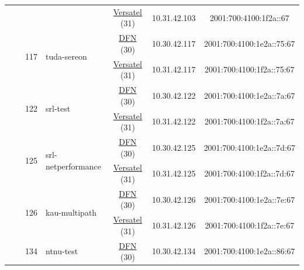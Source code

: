 \begin{small}
\begin{center}
\begin{longtable}{|c|c|c|c|c|c|c|c|}
  &  & \multicolumn{2}{|c|}{} & \multicolumn{2}{|c|}{\tiny{\href{http://www.versatel.de}{Versatel} (31)}} & \tiny{10.31.42.103} & \tiny{2001:700:4100:1f2a::67} \\* \cline{3-3}\cline{4-4}\cline{5-5}\cline{6-6}\cline{7-7}\cline{8-8}
  &  & \multirow{2}{*}{\tiny{117}} & \multicolumn{1}{|l|}{\multirow{2}{*}{\tiny{tuda-sereon}}} & \multicolumn{2}{|c|}{\tiny{\href{https://www.dfn.de}{DFN} (30)}} & \tiny{10.30.42.117} & \tiny{2001:700:4100:1e2a::75:67} \\* \cline{5-5}\cline{6-6}\cline{7-7}\cline{8-8}
  &  &  &  & \multicolumn{2}{|c|}{\tiny{\href{http://www.versatel.de}{Versatel} (31)}} & \tiny{10.31.42.117} & \tiny{2001:700:4100:1f2a::75:67} \\* \cline{3-3}\cline{4-4}\cline{5-5}\cline{6-6}\cline{7-7}\cline{8-8}
  &  & \multirow{2}{*}{\tiny{122}} & \multicolumn{1}{|l|}{\multirow{2}{*}{\tiny{srl-test}}} & \multicolumn{2}{|c|}{\tiny{\href{https://www.dfn.de}{DFN} (30)}} & \tiny{10.30.42.122} & \tiny{2001:700:4100:1e2a::7a:67} \\* \cline{5-5}\cline{6-6}\cline{7-7}\cline{8-8}
  &  &  &  & \multicolumn{2}{|c|}{\tiny{\href{http://www.versatel.de}{Versatel} (31)}} & \tiny{10.31.42.122} & \tiny{2001:700:4100:1f2a::7a:67} \\* \cline{3-3}\cline{4-4}\cline{5-5}\cline{6-6}\cline{7-7}\cline{8-8}
  &  & \multirow{2}{*}{\tiny{125}} & \multicolumn{1}{|l|}{\multirow{2}{*}{\tiny{srl-netperformance}}} & \multicolumn{2}{|c|}{\tiny{\href{https://www.dfn.de}{DFN} (30)}} & \tiny{10.30.42.125} & \tiny{2001:700:4100:1e2a::7d:67} \\* \cline{5-5}\cline{6-6}\cline{7-7}\cline{8-8}
  &  &  &  & \multicolumn{2}{|c|}{\tiny{\href{http://www.versatel.de}{Versatel} (31)}} & \tiny{10.31.42.125} & \tiny{2001:700:4100:1f2a::7d:67} \\* \cline{3-3}\cline{4-4}\cline{5-5}\cline{6-6}\cline{7-7}\cline{8-8}
  &  & \multirow{2}{*}{\tiny{126}} & \multicolumn{1}{|l|}{\multirow{2}{*}{\tiny{kau-multipath}}} & \multicolumn{2}{|c|}{\tiny{\href{https://www.dfn.de}{DFN} (30)}} & \tiny{10.30.42.126} & \tiny{2001:700:4100:1e2a::7e:67} \\* \cline{5-5}\cline{6-6}\cline{7-7}\cline{8-8}
  &  &  &  & \multicolumn{2}{|c|}{\tiny{\href{http://www.versatel.de}{Versatel} (31)}} & \tiny{10.31.42.126} & \tiny{2001:700:4100:1f2a::7e:67} \\* \cline{3-3}\cline{4-4}\cline{5-5}\cline{6-6}\cline{7-7}\cline{8-8}
  &  & \multirow{2}{*}{\tiny{134}} & \multicolumn{1}{|l|}{\multirow{2}{*}{\tiny{ntnu-test}}} & \multicolumn{2}{|c|}{\tiny{\href{https://www.dfn.de}{DFN} (30)}} & \tiny{10.30.42.134} & \tiny{2001:700:4100:1e2a::86:67} \\* \cline{5-5}\cline{6-6}\cline{7-7}\cline{8-8}

\end{longtable}
\end{center}
\end{small}
